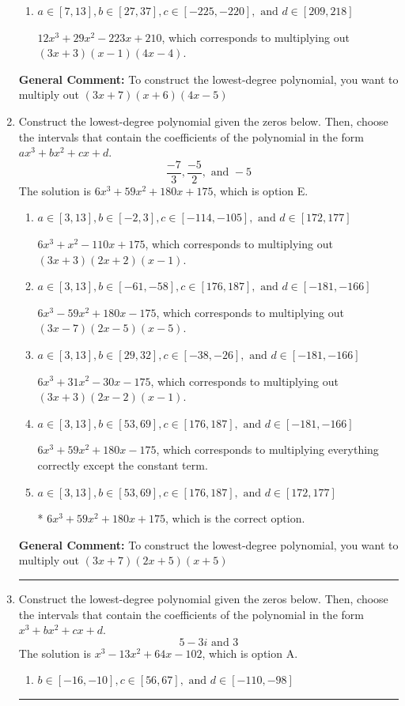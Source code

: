 \documentclass{extbook}[14pt]
\newcommand{\litem}[1]{\item #1

\rule{\textwidth}{0.4pt}}
\begin{document}
\begin{enumerate}
{\begin{enumerate}[label=\Alph*.]
* $12x^{3} +85 x^{2} +43 x -210$, which is the correct option.
\item \( a \in [7, 13], b \in [27, 37], c \in [-225, -220], \text{ and } d \in [209, 218] \)

$12x^{3} +29 x^{2} -223 x + 210$, which corresponds to multiplying out $(3x + 3)(x -1)(4x -4)$.
\end{enumerate}

\textbf{General Comment:} To construct the lowest-degree polynomial, you want to multiply out $(3x + 7)(x + 6)(4x -5)$
}
\litem{
Construct the lowest-degree polynomial given the zeros below. Then, choose the intervals that contain the coefficients of the polynomial in the form $ax^3+bx^2+cx+d$.
\[ \frac{-7}{3}, \frac{-5}{2}, \text{ and } -5 \]
The solution is \( 6x^{3} +59 x^{2} +180 x + 175 \), which is option E.\begin{enumerate}[label=\Alph*.]
\item \( a \in [3, 13], b \in [-2, 3], c \in [-114, -105], \text{ and } d \in [172, 177] \)

$6x^{3} + x^{2} -110 x + 175$, which corresponds to multiplying out $(3x + 3)(2x + 2)(x -1)$.
\item \( a \in [3, 13], b \in [-61, -58], c \in [176, 187], \text{ and } d \in [-181, -166] \)

$6x^{3} -59 x^{2} +180 x -175$, which corresponds to multiplying out $(3x -7)(2x -5)(x -5)$.
\item \( a \in [3, 13], b \in [29, 32], c \in [-38, -26], \text{ and } d \in [-181, -166] \)

$6x^{3} +31 x^{2} -30 x -175$, which corresponds to multiplying out $(3x + 3)(2x -2)(x -1)$.
\item \( a \in [3, 13], b \in [53, 69], c \in [176, 187], \text{ and } d \in [-181, -166] \)

$6x^{3} +59 x^{2} +180 x -175$, which corresponds to multiplying everything correctly except the constant term.
\item \( a \in [3, 13], b \in [53, 69], c \in [176, 187], \text{ and } d \in [172, 177] \)

* $6x^{3} +59 x^{2} +180 x + 175$, which is the correct option.
\end{enumerate}

\textbf{General Comment:} To construct the lowest-degree polynomial, you want to multiply out $(3x + 7)(2x + 5)(x + 5)$
}
\litem{
Construct the lowest-degree polynomial given the zeros below. Then, choose the intervals that contain the coefficients of the polynomial in the form $x^3+bx^2+cx+d$.
\[ 5 - 3 i \text{ and } 3 \]
The solution is \( x^{3} -13 x^{2} +64 x -102 \), which is option A.\begin{enumerate}[label=\Alph*.]
\item \( b \in [-16, -10], c \in [56, 67], \text{ and } d \in [-110, -98] \)


\end{enumerate}}
\end{enumerate}
\end{document}
